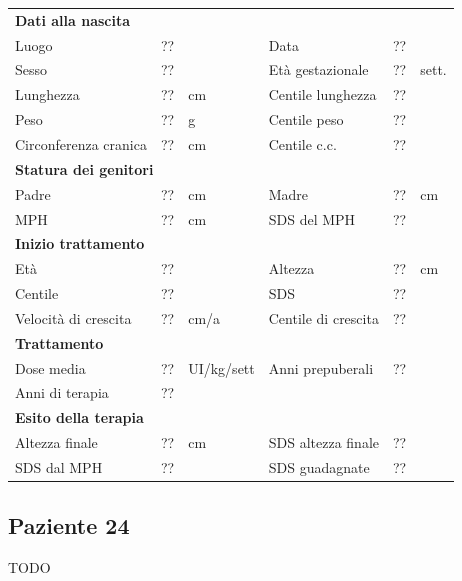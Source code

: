 \begin{table}[!h]
\begin{tabular}{lrllrl}
\toprule
\multicolumn{6}{l}{\textbf{Dati alla nascita}}\\
Luogo 		& \multicolumn{2}{l}{??} 	& Data 					& \multicolumn{2}{l}{??} 	\\
Sesso 		& \multicolumn{2}{l}{??} 	& Età gestazionale 		& ?? 		& sett.\\
Lunghezza 	& ?? 		& cm 				& Centile lunghezza		& ?? 		\\
Peso 		& ?? 		& g					& Centile peso			& ?? 		\\
Circonferenza cranica	& ?? 		& cm 	& Centile c.c.			& ?? \\
\midrule
\multicolumn{6}{l}{\textbf{Statura dei genitori}}\\
Padre 		& ?? & cm 	& Madre 				& ?? & cm \\
MPH 		& ?? & cm 	& SDS del MPH 			& ??\\
\midrule
\multicolumn{6}{l}{\textbf{Inizio trattamento}} \\
Età	& ?? & 		& Altezza 				& ?? & cm  \\
Centile & ?? 	 &		& SDS		& ?? \\
Velocità di crescita & ?? & cm/a	& Centile di crescita & ??\\
\midrule
\multicolumn{6}{l}{\textbf{Trattamento}} \\
Dose media		& ?? & UI/kg/sett & Anni prepuberali & ??\\
Anni di terapia & ??\\
\midrule
\multicolumn{6}{l}{\textbf{Esito della terapia}} \\
Altezza finale			& ?? & cm 	& SDS altezza finale		& ??\\
SDS dal MPH				& ?? &		& SDS guadagnate 			& ??\\
\bottomrule
\end{tabular}
\end{table}
\clearpage


\subsection*{Paziente 24}

TODO

